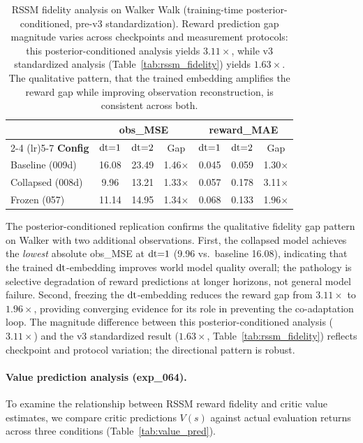 \begin{table}[h]
\centering
\caption{RSSM fidelity analysis on Walker Walk (training-time posterior-conditioned, pre-v3 standardization). Reward prediction gap magnitude varies across checkpoints and measurement protocols: this posterior-conditioned analysis yields $3.11\times$, while v3 standardized analysis (Table~\ref{tab:rssm_fidelity}) yields $1.63\times$. The qualitative pattern, that the trained embedding amplifies the reward gap while improving observation reconstruction, is consistent across both.}
\label{tab:rssm_fidelity_ext}
\footnotesize
\setlength{\tabcolsep}{4pt}
\begin{tabular}{lcccccc}
\toprule
& \multicolumn{3}{c}{\textbf{obs\_MSE}} & \multicolumn{3}{c}{\textbf{reward\_MAE}} \\
\cmidrule(lr){2-4} \cmidrule(lr){5-7}
\textbf{Config} & $\mathrm{dt}{=}1$ & $\mathrm{dt}{=}2$ & Gap & $\mathrm{dt}{=}1$ & $\mathrm{dt}{=}2$ & Gap \\
\midrule
Baseline (009d) & 16.08 & 23.49 & 1.46$\times$ & 0.045 & 0.059 & 1.30$\times$ \\
Collapsed (008d) & 9.96 & 13.21 & 1.33$\times$ & 0.057 & 0.178 & 3.11$\times$ \\
Frozen (057) & 11.14 & 14.95 & 1.34$\times$ & 0.068 & 0.133 & 1.96$\times$ \\
\bottomrule
\end{tabular}
\end{table}

The posterior-conditioned replication confirms the qualitative fidelity gap pattern on Walker with two additional observations. First, the collapsed model achieves the \emph{lowest} absolute obs\_MSE at $\mathrm{dt}{=}1$ (9.96 vs.\ baseline 16.08), indicating that the trained $\mathrm{dt}$-embedding improves world model quality overall; the pathology is selective degradation of reward predictions at longer horizons, not general model failure. Second, freezing the $\mathrm{dt}$-embedding reduces the reward gap from $3.11\times$ to $1.96\times$, providing converging evidence for its role in preventing the co-adaptation loop. The magnitude difference between this posterior-conditioned analysis ($3.11\times$) and the v3 standardized result ($1.63\times$, Table~\ref{tab:rssm_fidelity}) reflects checkpoint and protocol variation; the directional pattern is robust.

\paragraph{Value prediction analysis (exp\_064).}
To examine the relationship between RSSM reward fidelity and critic value estimates, we compare critic predictions $V(s)$ against actual evaluation returns across three conditions (Table~\ref{tab:value_pred}).

